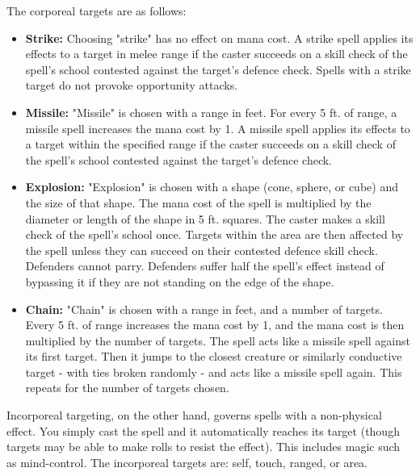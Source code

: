 The corporeal targets are as follows:
\begin{itemize}
    \item \textbf{Strike:} Choosing "strike" has no effect on mana cost. A
        strike spell applies its effects to a target in melee range if the
        caster succeeds on a skill check of the spell's school contested against
        the target's defence check. Spells with a strike target do not provoke
        opportunity attacks.
    \item \textbf{Missile:} "Missile" is chosen with a range in feet. For every
        5 ft. of range, a missile spell increases the mana cost by 1. A missile
        spell applies its effects to a target within the specified range if the
        caster succeeds on a skill check of the spell's school contested
        against the target's defence check.
    \item \textbf{Explosion:} "Explosion" is chosen with a shape (cone, sphere, or
        cube) and the size of that shape. The mana cost of the spell is multiplied
        by the diameter or length of the shape in 5 ft. squares. The caster makes a skill check of the spell's school
        once. Targets within the area are then affected by the spell unless
        they can succeed on their contested defence skill check. Defenders
        cannot parry. Defenders suffer half the spell's effect instead of
        bypassing it if they are not standing on the edge of the shape.
    \item \textbf{Chain:} "Chain" is chosen with a range in feet, and a number
        of targets. Every 5 ft. of range increases the mana cost by 1, and the
        mana cost is then multiplied by the number of targets. The spell acts
        like a missile spell against its first target. Then it jumps to the
        closest creature or similarly conductive target - with ties broken
        randomly - and acts like a missile spell again. This repeats for the
        number of targets chosen.
\end{itemize}

Incorporeal targeting, on the other hand, governs spells with a non-physical
effect. You simply cast the spell and it automatically reaches its target (though
targets may be able to make rolls to resist the effect). This includes magic
such as mind-control. The incorporeal targets are: self, touch, ranged, or
area.

